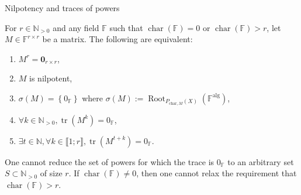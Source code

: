 \begin{appendixitem}{Nilpotency and traces of powers}
    \begin{lemma}
        For \( r \in \mathbb{N}_{>0} \) and any field \( \mathbb{F} \) such that \( \operatorname{char}\left(\mathbb{F}\right) = 0 \) or \( \operatorname{char}\left(\mathbb{F}\right) > r \), let \( M \in \mathbb{F}^{r \times r} \) be a matrix. The following are equivalent:
        \begin{enumerate}
            \item \( M^r = \mathbf{0}_{r \times r} \),
            \item \( M \) is nilpotent,
            \item \( \sigma\left(M\right) = \left\{0_{\mathbb{F}}\right\} \) where \( \sigma\left(M\right) := \operatorname{Root}_{P_{\text{char}, M}\left(X\right)}\left(\mathbb{F}^{\text{alg}}\right) \),
            \item \( \forall k \in \mathbb{N}_{>0}, \operatorname{tr}\left(M^k\right) = 0_{\mathbb{F}} \),
            \item \( \exists t \in \mathbb{N}, \forall k \in \llbracket 1;r \rrbracket, \operatorname{tr}\left(M^{t+k}\right) = 0_{\mathbb{F}} \).
        \end{enumerate}
        One cannot reduce the set of powers for which the trace is \( 0_{\mathbb{F}} \) to an arbitrary set \( S \subset \mathbb{N}_{>0} \) of size \( r \). If \( \operatorname{char}\left(\mathbb{F}\right) \neq 0 \), then one cannot relax the requirement that \( \operatorname{char}\left(\mathbb{F}\right) > r \).
    \end{lemma}


\end{appendixitem}
